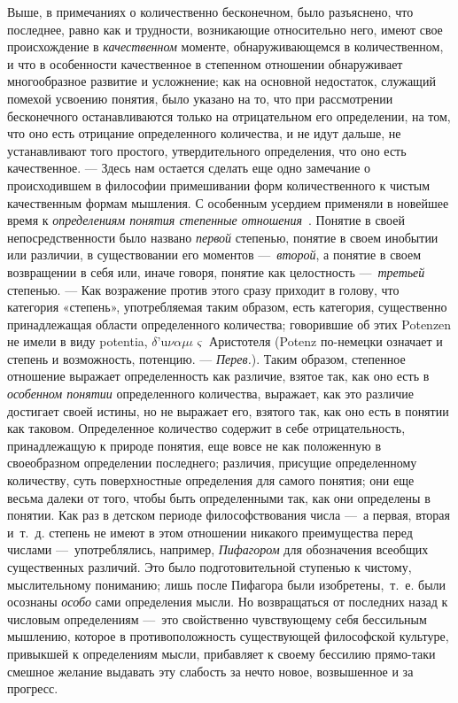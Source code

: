 Выше, в примечаниях о количественно бесконечном, было разъяснено, что
последнее, равно как и трудности, возникающие относительно него, имеют свое
происхождение в {\em качественном} моменте,
обнаруживающемся в количественном, и что в особенности качественное в
степенном отношении обнаруживает многообразное развитие и усложнение; как
на основной недостаток, служащий помехой усвоению понятия, было указано на
то, что при рассмотрении бесконечного останавливаются только на
отрицательном его определении, на том, что оно есть отрицание определенного
количества, и не идут дальше, не устанавливают того простого,
утвердительного определения, что оно есть качественное. — Здесь нам
остается сделать еще одно замечание о происходившем в философии
примешивании форм количественного к чистым качественным формам мышления. С
особенным усердием применяли в новейшее время к
{\em определениям понятия степенные
отношения}~.
Понятие в своей непосредственности было названо
{\em первой} степенью, понятие в своем инобытии или
различии, в существовании его моментов —~{\em второй},
а понятие в своем возвращении в себя или, иначе говоря, понятие как
целостность —~{\em третьей} степенью. — Как возражение
против этого сразу приходит в голову, что категория «степень»,
употребляемая таким образом, есть категория, существенно принадлежащая
области определенного количества; говорившие об этих Potenzen не имели в
виду potentia, $\delta \text{'u} \nu \alpha \mu \iota \varsigma
$ Аристотеля (Potenz по-немецки означает и степень и возможность, потенцию.
— {\em Перев.}). Таким образом, степенное отношение выражает
определенность как различие, взятое так, как оно есть в
{\em особенном понятии} определенного количества,
выражает, как это различие достигает своей истины, но не выражает его,
взятого так, как оно есть в понятии как таковом. Определенное количество
содержит в себе отрицательность, принадлежащую к природе понятия, еще вовсе
не как положенную в своеобразном определении последнего; различия, присущие
определенному количеству, суть поверхностные определения для самого
понятия; они еще весьма далеки от того, чтобы быть определенными так, как
они определены в понятии. Как раз в детском периоде философствования числа
—~а первая, вторая и~т.~д. степень не имеют в этом отношении никакого
преимущества перед числами —~употреблялись, например,
{\em Пифагором} для обозначения всеобщих существенных
различий. Это было подготовительной ступенью к чистому, мыслительному
пониманию; лишь после Пифагора были изобретены,~т.~е. были осознаны
{\em особо} сами определения мысли. Но возвращаться от
последних назад к числовым определениям —~это свойственно чувствующему себя
бессильным мышлению, которое в противоположность существующей философской
культуре, привыкшей к определениям мысли, прибавляет к своему бессилию
прямо-таки смешное желание выдавать эту слабость за нечто новое,
возвышенное и за прогресс.

